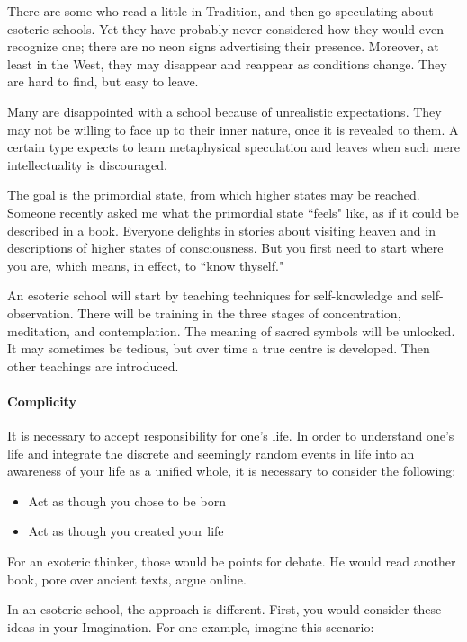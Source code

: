 There are some who read a little in Tradition, and then go speculating about esoteric schools. Yet they have probably never considered how they would even recognize one; there are no neon signs advertising their presence. Moreover, at least in the West, they may disappear and reappear as conditions change. They are hard to find, but easy to leave.

Many are disappointed with a school because of unrealistic expectations. They may not be willing to face up to their inner nature, once it is revealed to them. A certain type expects to learn metaphysical speculation and leaves when such mere intellectuality is discouraged.

The goal is the primordial state, from which higher states may be reached. Someone recently asked me what the primordial state ``feels" like, as if it could be described in a book. Everyone delights in stories about visiting heaven and in descriptions of higher states of consciousness. But you first need to start where you are, which means, in effect, to ``know thyself."

An esoteric school will start by teaching techniques for self-knowledge and self-observation. There will be training in the three stages of concentration, meditation, and contemplation. The meaning of sacred symbols will be unlocked. It may sometimes be tedious, but over time a true centre is developed. Then other teachings are introduced.

\paragraph{Complicity}
It is necessary to accept responsibility for one's life. In order to understand one's life and integrate the discrete and seemingly random events in life into an awareness of your life as a unified whole, it is necessary to consider the following:

\begin{itemize}
\item Act as though you chose to be born 
\item Act as though you created your life 
\end{itemize}
For an exoteric thinker, those would be points for debate. He would read another book, pore over ancient texts, argue online.

In an esoteric school, the approach is different. First, you would consider these ideas in your Imagination. For one example, imagine this scenario:


